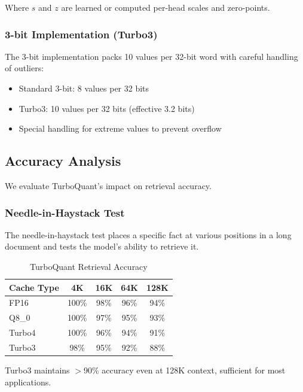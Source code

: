 Where $s$ and $z$ are learned or computed per-head scales and zero-points.

\subsubsection{3-bit Implementation (Turbo3)}

The 3-bit implementation packs 10 values per 32-bit word with careful handling of outliers:

\begin{itemize}
    \item Standard 3-bit: 8 values per 32 bits
    \item Turbo3: 10 values per 32 bits (effective 3.2 bits)
    \item Special handling for extreme values to prevent overflow
\end{itemize}

\subsection{Accuracy Analysis}

We evaluate TurboQuant's impact on retrieval accuracy.

\subsubsection{Needle-in-Haystack Test}

The needle-in-haystack test places a specific fact at various positions in a long document and tests the model's ability to retrieve it.

\begin{table}[h]
\centering
\caption{TurboQuant Retrieval Accuracy}
\label{tab:turboquant_accuracy}
\begin{tabular}{lcccc}
\toprule
\textbf{Cache Type} & \textbf{4K} & \textbf{16K} & \textbf{64K} & \textbf{128K} \\
\midrule
FP16 & 100\% & 98\% & 96\% & 94\% \\
Q8\_0 & 100\% & 97\% & 95\% & 93\% \\
Turbo4 & 100\% & 96\% & 94\% & 91\% \\
Turbo3 & 98\% & 95\% & 92\% & 88\% \\
\bottomrule
\end{tabular}
\end{table}

Turbo3 maintains $>$90\% accuracy even at 128K context, sufficient for most applications.


